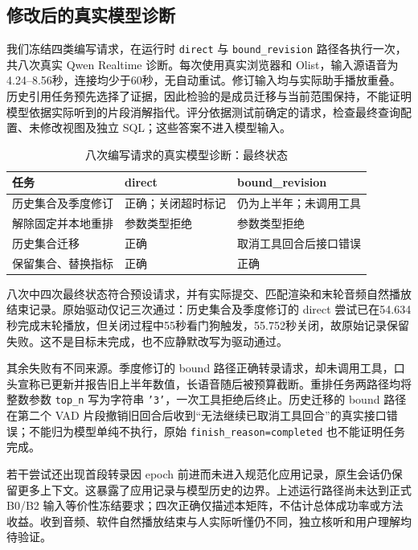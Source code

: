 \documentclass[conference]{IEEEtran}
\begin{document}
\subsection{修改后的真实模型诊断}
我们冻结四类编写请求，在运行时 \texttt{direct} 与 \texttt{bound\_revision} 路径各执行一次，共八次真实 Qwen Realtime 诊断。每次使用真实浏览器和 Olist，输入源语音为4.24--8.56秒，连接均少于60秒，无自动重试。修订输入均与实际助手播放重叠。历史引用任务预先选择了证据，因此检验的是成员迁移与当前范围保持，不能证明模型依据实际听到的片段消解指代。评分依据测试前确定的请求，检查最终查询配置、未修改视图及独立 SQL；这些答案不进入模型输入。

\begin{table}[t]
\caption{八次编写请求的真实模型诊断：最终状态}
\label{tab:real-matrix}
\centering\small
\begin{tabularx}{\columnwidth}{@{}p{}YY@{}}
\toprule
任务 & direct & bound\_revision \\
\midrule
历史集合及季度修订 & 正确；关闭超时标记 & 仍为上半年；未调用工具 \\
解除固定并本地重排 & 参数类型拒绝 & 参数类型拒绝 \\
历史集合迁移 & 正确 & 取消工具回合后接口错误 \\
保留集合、替换指标 & 正确 & 正确 \\
\bottomrule
\end{tabularx}
\end{table}

八次中四次最终状态符合预设请求，并有实际提交、匹配渲染和末轮音频自然播放结束记录。原始驱动仅记三次通过：历史集合及季度修订的 direct 尝试已在54.634秒完成末轮播放，但关闭过程中55秒看门狗触发，55.752秒关闭，故原始记录保留失败。这不是目标未完成，也不应静默改写为驱动通过。

其余失败有不同来源。季度修订的 bound 路径正确转录请求，却未调用工具，口头宣称已更新并报告旧上半年数值，长语音随后被预算截断。重排任务两路径均将整数参数 \texttt{top\_n} 写为字符串 \texttt{'3'}，一次工具拒绝后终止。历史迁移的 bound 路径在第二个 VAD 片段撤销旧回合后收到“无法继续已取消工具回合”的真实接口错误；不能归为模型单纯不执行，原始 \texttt{finish\_reason=completed} 也不能证明任务完成。

若干尝试还出现首段转录因 epoch 前进而未进入规范化应用记录，原生会话仍保留更多上下文。这暴露了应用记录与模型历史的边界。上述运行路径尚未达到正式 B0/B2 输入等价性冻结要求；四次正确仅描述本矩阵，不估计总体成功率或方法收益。收到音频、软件自然播放结束与人实际听懂仍不同，独立核听和用户理解均待验证。
\end{document}
